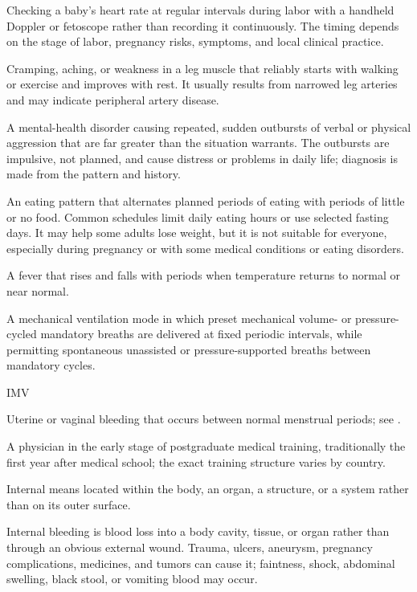  Checking a baby’s heart rate at regular intervals during labor with a handheld Doppler or fetoscope rather than recording it continuously. The timing depends on the stage of labor, pregnancy risks, symptoms, and local clinical practice.

 Cramping, aching, or weakness in a leg muscle that reliably starts with walking or exercise and improves with rest. It usually results from narrowed leg arteries and may indicate peripheral artery disease.

 A mental-health disorder causing repeated, sudden outbursts of verbal or physical aggression that are far greater than the situation warrants. The outbursts are impulsive, not planned, and cause distress or problems in daily life; diagnosis is made from the pattern and history.

 An eating pattern that alternates planned periods of eating with periods of little or no food. Common schedules limit daily eating hours or use selected fasting days. It may help some adults lose weight, but it is not suitable for everyone, especially during pregnancy or with some medical conditions or eating disorders.

 A fever that rises and falls with periods when temperature returns to normal or near normal.

 A mechanical ventilation mode in which preset mechanical volume- or pressure-cycled mandatory breaths are delivered at fixed periodic intervals, while permitting spontaneous unassisted or pressure-supported breaths between mandatory cycles.

\synonyms
IMV

 Uterine or vaginal bleeding that occurs between normal menstrual periods; see .

 A physician in the early stage of postgraduate medical training, traditionally the first year after medical school; the exact training structure varies by country.

 Internal means located within the body, an organ, a structure, or a system rather than on its outer surface.

 Internal bleeding is blood loss into a body cavity, tissue, or organ rather than through an obvious external wound. Trauma, ulcers, aneurysm, pregnancy complications, medicines, and tumors can cause it; faintness, shock, abdominal swelling, black stool, or vomiting blood may occur.


